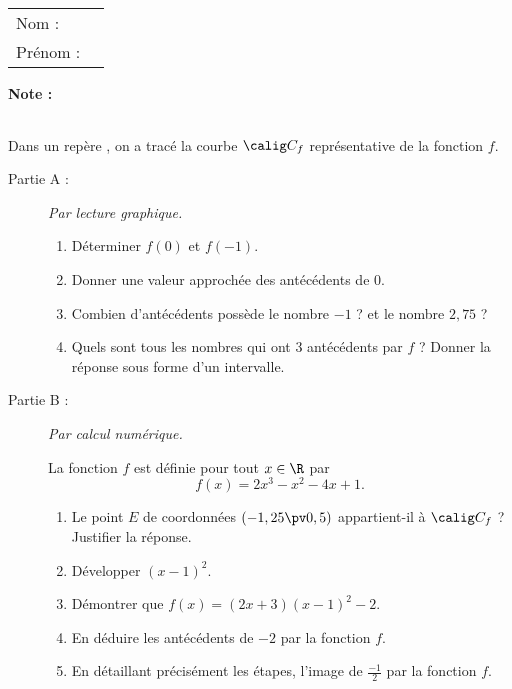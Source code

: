 \documentclass[10pt,french]{book}
\newcommand\presentation{
    \begin{tabular}{ll}
        Nom : \\[5pt]
        Prénom :
    \end{tabular}
\hfill
    \textbf{Note :}
        \renewcommand\arraystretch{2.3}
    \begin{tabular}{|c|}
        \hline
            \slashbox{\Huge\bfseries\phantom{10}}{\Huge\bfseries 10}\\
        \hline
    \end{tabular}
        \renewcommand\arraystretch{1.5}\par
    \vspace{1cm}
    \hrulefill
}
\begin{document}
\begin{landscape}
\presentation

\begin{multicols}{2}
\small
Dans un repère \OIJ, on a tracé la courbe $\calig C_f$ représentative de la fonction $f$.\medskip


\begin{description}
    \item[Partie A :] \textit{Par lecture graphique.}
       \begin{enumerate}
            \item Déterminer $f(0)$ et $f(-1)$.
            \item Donner une valeur approchée des antécédents de $0$.
            \item Combien d'antécédents possède le nombre $-1$ ? et le nombre $2,75$ ?
            \item Quels sont tous les nombres qui ont $3$ antécédents par $f$ ? Donner la réponse sous forme d'un intervalle.
        \end{enumerate}
    \item[Partie B :] \textit{Par calcul numérique.}\par
    La fonction $f$ est définie pour tout $x \in \R$ par \[f(x) = 2x^3 -x^2 - 4x + 1.\]
        \begin{enumerate}
            \item Le point $E$ de coordonnées $(-1,25 \pv 0,5)$ appartient-il à $\calig C_f$ ? Justifier la réponse.
            \item Développer $(x - 1)^2$.
            \item Démontrer que $f(x) = (2x+3)(x-1)^2-2$.
            \item En déduire les antécédents de $-2$ par la fonction $f$.
            \item En détaillant précisément les étapes, l'image de $\frac{-1}{2}$ par la fonction $f$.
        \end{enumerate}
\end{description}

\begin{center}
\end{center}


\end{multicols}
\end{landscape}
\end{document}
